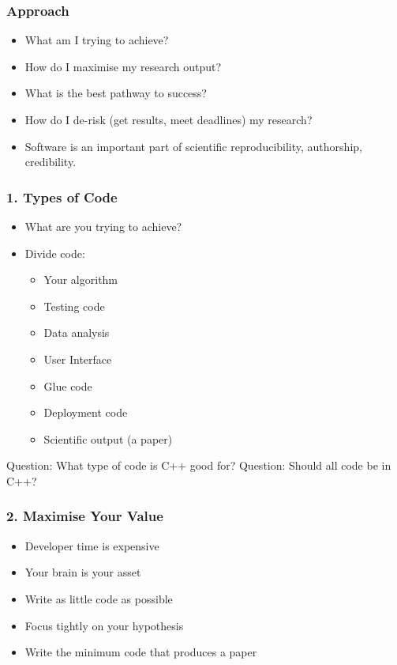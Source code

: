 \hypertarget{approach}{%
\subsubsection{Approach}\label{approach}}

\begin{itemize}
\tightlist
\item
  What am I trying to achieve?
\item
  How do I maximise my research output?
\item
  What is the best pathway to success?
\item
  How do I de-risk (get results, meet deadlines) my research?
\item
  Software is an important part of scientific reproducibility,
  authorship, credibility.
\end{itemize}

\hypertarget{types-of-code}{%
\subsubsection{1. Types of Code}\label{types-of-code}}

\begin{itemize}
\tightlist
\item
  What are you trying to achieve?
\item
  Divide code:

  \begin{itemize}
  \tightlist
  \item
    Your algorithm
  \item
    Testing code
  \item
    Data analysis
  \item
    User Interface
  \item
    Glue code
  \item
    Deployment code
  \item
    Scientific output (a paper)
  \end{itemize}
\end{itemize}

Question: What type of code is C++ good for? Question: Should all code
be in C++?

\hypertarget{maximise-your-value}{%
\subsubsection{2. Maximise Your Value}\label{maximise-your-value}}

\begin{itemize}
\tightlist
\item
  Developer time is expensive
\item
  Your brain is your asset
\item
  Write as little code as possible
\item
  Focus tightly on your hypothesis
\item
  Write the minimum code that produces a paper
\end{itemize}


